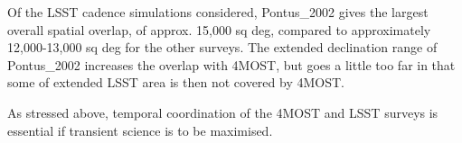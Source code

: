 \documentclass[a4paper,10pt]{article}
\begin{document}
 	 
Of the LSST cadence simulations considered, Pontus\_2002 gives the
largest overall spatial overlap, of approx. 15,000 sq deg, compared to
approximately 12,000-13,000 sq deg for the other surveys. The extended
declination range of Pontus\_2002 increases the overlap with 4MOST,
but goes a little too far in that some of extended LSST area is then
not covered by 4MOST.

As stressed above, temporal coordination of the 4MOST and LSST surveys is
essential if transient science is to be maximised.

\newpage



\end{document}
